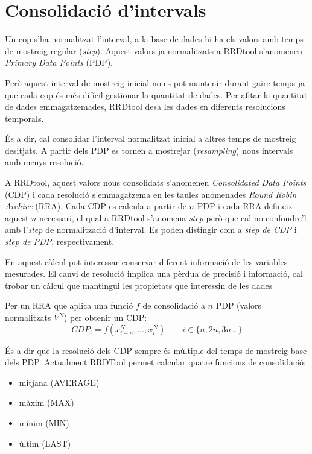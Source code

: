 \section[Consolidació]{Consolidació d'intervals}

Un cop s'ha normalitzat l'interval, a la base de dades hi ha els valors amb temps de mostreig regular (\emph{step}). Aquest valors ja normalitzats a RRDtool s'anomenen \emph{Primary Data Points} (PDP). 

Però aquest interval de mostreig inicial no es pot mantenir durant gaire temps ja que cada cop és més difícil gestionar la quantitat de dades. Per afitar la quantitat de dades emmagatzemades, RRDtool desa les dades en diferents resolucions temporals. 

És a dir, cal consolidar l'interval normalitzat inicial a altres temps de mostreig desitjats. A partir dels PDP es tornen a mostrejar (\emph{resampling}) nous intervals amb menys resolució. 

A RRDtool, aquest valors nous consolidats s'anomenen \emph{Consolidated Data Points} (CDP) i cada resolució s'emmagatzema en les taules anomenades \emph{Round Robin Archive} (RRA).
Cada CDP es calcula a partir de $n$ PDP i cada RRA defineix aquest $n$ necessari, el qual a RRDtool s'anomena \emph{step} però que cal no confondre'l amb l'\emph{step} de normalització d'interval. Es poden distingir com a \emph{step de CDP} i \emph{step de PDP}, respectivament.


En aquest càlcul pot interessar conservar diferent informació de les variables mesurades. El canvi de resolució implica una pèrdua de precisió i informació, cal trobar un càlcul que mantingui les propietats que interessin de les dades

Per un RRA que aplica una funció $f$ de consolidació a $n$ PDP (valors normalitzats $V^N$) per obtenir un CDP:
$$
CDP_i = f(x^N_{i-n},\ldots,x^N_i) \qquad i \in \{ n,2n,3n\ldots \}
$$

És a dir que la resolució dels CDP sempre és múltiple del temps de mostreig base dels PDP. 
Actualment RRDTool permet calcular quatre funcions de consolidació: 

\begin{itemize}
\item mitjana (AVERAGE)
\item màxim (MAX)
\item mínim (MIN)
\item últim (LAST)
\end{itemize}

